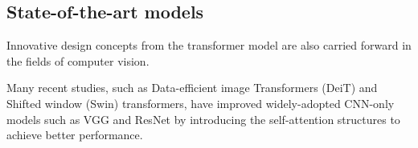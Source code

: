 \subsection{State-of-the-art models}

Innovative design concepts from the transformer model are also carried forward in the fields of computer vision.

Many recent studies, such as Data-efficient image Transformers (DeiT) and Shifted window (Swin) transformers, have improved widely-adopted CNN-only models such as VGG and ResNet by introducing the self-attention structures to achieve better performance.

\citet{srinivas2021bottleneck}

\citet{wang2021pyramid}

\citet{dai2021coatnet}
